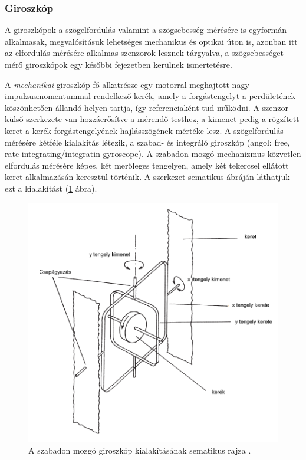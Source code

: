 \subsubsection{Giroszkóp}
\label{lingiro}

A giroszkópok a szögelfordulás valamint a szögsebesség mérésére is egyformán alkalmasak, megvalósításuk lehetséges mechanikus és optikai úton is, azonban itt az elfordulás mérésére alkalmas szenzorok lesznek tárgyalva, a szögsebességet mérő giroszkópok egy későbbi fejezetben kerülnek ismertetésre. 

A \textit{mechanikai} giroszkóp fő alkatrésze egy motorral meghajtott nagy impulzusmomentummal rendelkező kerék, amely a forgástengelyt a perdületének köszönhetően állandó helyen tartja, így referenciaként tud működni. A szenzor külső szerkezete van hozzáerősítve a mérendő testhez, a kimenet pedig a rögzített keret a kerék forgástengelyének hajlásszögének mértéke lesz. A szögelfordulás mérésére kétféle kialakítás létezik, a szabad- és integráló giroszkóp (angol: free, rate-integrating/integratin gyroscope). A szabadon mozgó mechanizmus közvetlen elfordulás mérésére képes, két merőleges tengelyen, amely két tekercsel ellátott keret alkalmazásán keresztül történik. A szerkezet sematikus ábráján láthatjuk ezt a kialakítást (\ref{freegyro} ábra). 
\begin{figure}
	\centering
	\includegraphics[width=\columnwidth/2]{figures/freegyro.png}
	\caption{A szabadon mozgó giroszkóp kialakításának sematikus rajza \cite{Morris2016b}.}
	\label{freegyro}
\end{figure}
